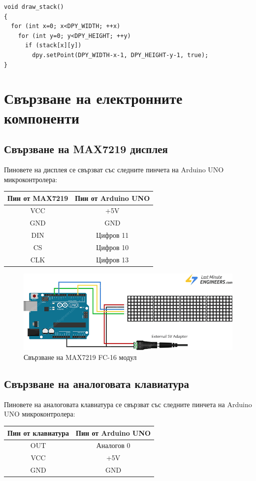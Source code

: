 \documentclass[titlepage, oneside, 14pt]{extbook}
\newcommand{\ard}{Arduino\texttrademark{}}
\begin{document}
\begin{verbatim}
void draw_stack()
{
  for (int x=0; x<DPY_WIDTH; ++x)
    for (int y=0; y<DPY_HEIGHT; ++y)
      if (stack[x][y])
        dpy.setPoint(DPY_WIDTH-x-1, DPY_HEIGHT-y-1, true);
}
\end{verbatim}

\section{Свързване на електронните компоненти\label{wiring}}

\subsection{Свързване на MAX7219 дисплея}

Пиновете на дисплея се свързват със следните пинчета на \ard{} UNO микроконтролера:

\begin{center}
  \begin{tabular}{c|c}
    Пин от MAX7219 & Пин от \ard{} UNO \\ 
    \hline
    VCC & +5V \\  
    GND & GND \\  
    DIN & Цифров 11 \\  
    CS & Цифров 10 \\  
    CLK & Цифров 13
  \end{tabular}
\end{center}

\begin{figure}[!htbp]
    \centering
    \includegraphics[width=0.5\linewidth]{img/display_wiring.png}
    \caption{Свързване на MAX7219 FC-16 модул}
\end{figure}

\subsection{Свързване на аналоговата клавиатура}

Пиновете на аналоговата клавиатура се свързват със следните пинчета на \ard{} UNO микроконтролера:

\begin{center}
  \begin{tabular}{c|c}
    Пин от клавиатура & Пин от \ard{} UNO \\ 
    \hline
    OUT & Аналогов 0 \\  
    VCC & +5V \\  
    GND & GND
  \end{tabular}
\end{center}
\end{document}
